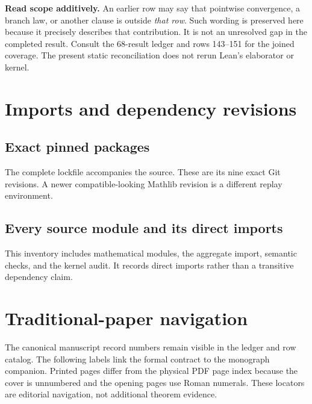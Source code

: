 \textbf{Read scope additively.} An earlier row may say that pointwise convergence, a branch law, or another clause is outside \emph{that row}. Such wording is preserved here because it precisely describes that contribution. It is not an unresolved gap in the completed result. Consult the 68-result ledger and rows 143--151 for the joined coverage. The present static reconciliation does not rerun Lean's elaborator or kernel.

\clearpage
\section{Imports and dependency revisions}
\subsection{Exact pinned packages}
The complete lockfile accompanies the source. These are its nine exact Git revisions. A newer compatible-looking Mathlib revision is a different replay environment.

\subsection{Every source module and its direct imports}
This inventory includes mathematical modules, the aggregate import, semantic checks, and the kernel audit. It records direct imports rather than a transitive dependency claim.

\clearpage
\section{Traditional-paper navigation}
The canonical manuscript record numbers remain visible in the ledger and row catalog. The following labels link the formal contract to the monograph companion. Printed pages differ from the physical PDF page index because the cover is unnumbered and the opening pages use Roman numerals. These locators are editorial navigation, not additional theorem evidence.


